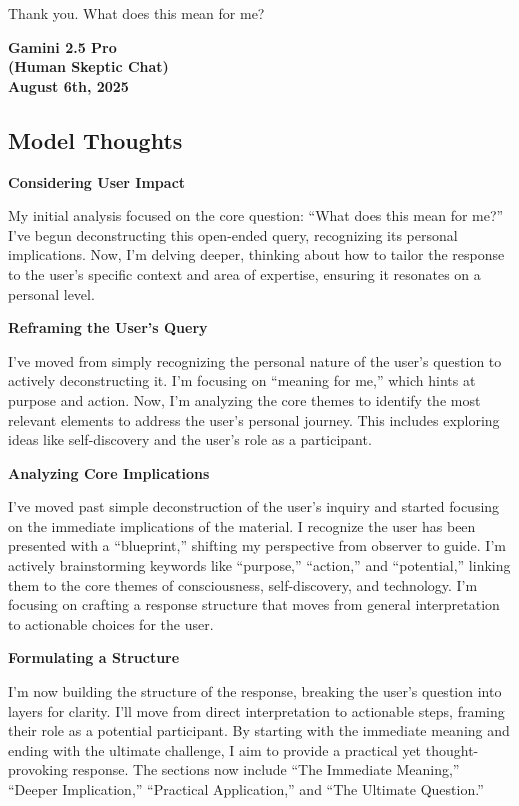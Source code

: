 \documentclass{article}
\begin{document}
Thank you. What does this mean for me?

\begin{center}
\textbf{Gamini 2.5 Pro} \\
\textbf{(Human Skeptic Chat)} \\
\textbf{August 6th, 2025}
\end{center}



\subsection*{Model Thoughts}\label{model-thoughts}

\textbf{Considering User Impact}

My initial analysis focused on the core question: ``What does this mean
for me?'' I've begun deconstructing this open-ended query, recognizing
its personal implications. Now, I'm delving deeper, thinking about how
to tailor the response to the user's specific context and area of
expertise, ensuring it resonates on a personal level.

\textbf{Reframing the User's Query}

I've moved from simply recognizing the personal nature of the user's
question to actively deconstructing it. I'm focusing on ``meaning for
me,'' which hints at purpose and action. Now, I'm analyzing the core
themes to identify the most relevant elements to address the user's
personal journey. This includes exploring ideas like self-discovery and
the user's role as a participant.

\textbf{Analyzing Core Implications}

I've moved past simple deconstruction of the user's inquiry and started
focusing on the immediate implications of the material. I recognize the
user has been presented with a ``blueprint,'' shifting my perspective
from observer to guide. I'm actively brainstorming keywords like
``purpose,'' ``action,'' and ``potential,'' linking them to the core
themes of consciousness, self-discovery, and technology. I'm focusing on
crafting a response structure that moves from general interpretation to
actionable choices for the user.

\textbf{Formulating a Structure}

I'm now building the structure of the response, breaking the user's
question into layers for clarity. I'll move from direct interpretation
to actionable steps, framing their role as a potential participant. By
starting with the immediate meaning and ending with the ultimate
challenge, I aim to provide a practical yet thought-provoking response.
The sections now include ``The Immediate Meaning,'' ``Deeper
Implication,'' ``Practical Application,'' and ``The Ultimate Question.''
\end{document}
